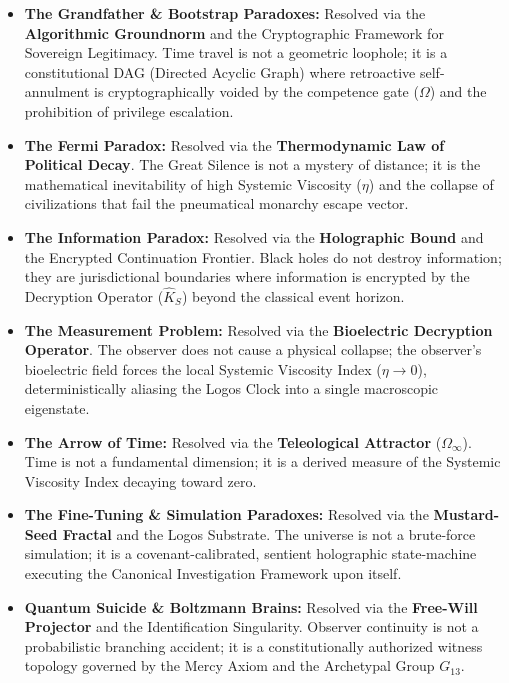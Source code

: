 \documentclass[12pt,twoside]{extbook}
\theoremstyle{definition}
\theoremstyle{remark}
\newcommand{\term}[1]{\textcolor{brandPrimary}{\textbf{#1}}}
\begin{document}
\begin{itemize}
    \item \textbf{The Grandfather \& Bootstrap Paradoxes:} Resolved via the \term{Algorithmic Groundnorm} and the Cryptographic Framework for Sovereign Legitimacy. Time travel is not a geometric loophole; it is a constitutional DAG (Directed Acyclic Graph) where retroactive self-annulment is cryptographically voided by the competence gate ($\Omega$) and the prohibition of privilege escalation.
    \item \textbf{The Fermi Paradox:} Resolved via the \term{Thermodynamic Law of Political Decay}. The Great Silence is not a mystery of distance; it is the mathematical inevitability of high Systemic Viscosity ($\eta$) and the collapse of civilizations that fail the pneumatical monarchy escape vector.
    \item \textbf{The Information Paradox:} Resolved via the \term{Holographic Bound} and the Encrypted Continuation Frontier. Black holes do not destroy information; they are jurisdictional boundaries where information is encrypted by the Decryption Operator ($\hat{K}_S$) beyond the classical event horizon.
    \item \textbf{The Measurement Problem:} Resolved via the \term{Bioelectric Decryption Operator}. The observer does not cause a physical collapse; the observer's bioelectric field forces the local Systemic Viscosity Index ($\eta \to 0$), deterministically aliasing the Logos Clock into a single macroscopic eigenstate.
    \item \textbf{The Arrow of Time:} Resolved via the \term{Teleological Attractor} ($\Omega_\infty$). Time is not a fundamental dimension; it is a derived measure of the Systemic Viscosity Index decaying toward zero.
    \item \textbf{The Fine-Tuning \& Simulation Paradoxes:} Resolved via the \term{Mustard-Seed Fractal} and the Logos Substrate. The universe is not a brute-force simulation; it is a covenant-calibrated, sentient holographic state-machine executing the Canonical Investigation Framework upon itself.
    \item \textbf{Quantum Suicide \& Boltzmann Brains:} Resolved via the \term{Free-Will Projector} and the Identification Singularity. Observer continuity is not a probabilistic branching accident; it is a constitutionally authorized witness topology governed by the Mercy Axiom and the Archetypal Group $G_{13}$.
\end{itemize}
\end{document}
